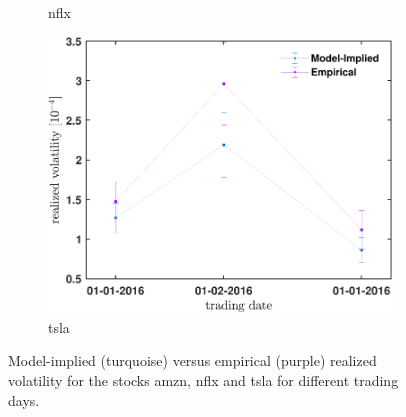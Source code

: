 \documentclass[11pt, a4paper]{thesis}  %
\begin{document}
\begin{figure}[H]
\begin{subfigure}[b]{0.3\textwidth}
        \caption{\ac{nflx}}
        \label{figure:results:realized_volatility_vs_trading_date:nflx}
    \end{subfigure}
    \hfill
	\begin{subfigure}[b]{0.3\textwidth}
        \centering
        \includegraphics[width=\textwidth]{./RealizedVolatility/TSLA/realized_volatility_predicted_vs_actual.pdf}
        \caption{\ac{tsla}}
        \label{figure:results:realized_volatility_vs_trading_date:tsla}
    \end{subfigure}
	
	\caption{Model-implied (turquoise) versus empirical (purple) realized volatility 
	for the stocks \ac{amzn}, \ac{nflx} and \ac{tsla} for different trading days.}	
	\label{figure:results:realized_volatility_vs_trading_date}
\end{figure}

%
\end{document}
